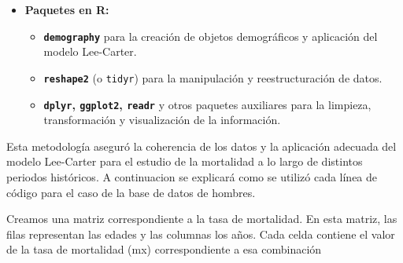 \documentclass[
]{article}
\newenvironment{Shaded}{\begin{snugshade}}{\end{snugshade}}
\newcommand{\AttributeTok}[1]{\textcolor[rgb]{0.77,0.63,0.00}{#1}}
\newcommand{\CommentTok}[1]{\textcolor[rgb]{0.56,0.35,0.01}{\textit{#1}}}
\newcommand{\DecValTok}[1]{\textcolor[rgb]{0.00,0.00,0.81}{#1}}
\newcommand{\FunctionTok}[1]{\textcolor[rgb]{0.00,0.00,0.00}{#1}}
\newcommand{\NormalTok}[1]{#1}
\newcommand{\OtherTok}[1]{\textcolor[rgb]{0.56,0.35,0.01}{#1}}
\newcommand{\SpecialCharTok}[1]{\textcolor[rgb]{0.00,0.00,0.00}{#1}}
\newcommand{\StringTok}[1]{\textcolor[rgb]{0.31,0.60,0.02}{#1}}
\providecommand{\tightlist}{%
  \setlength{\itemsep}{0pt}\setlength{\parskip}{0pt}}
\begin{document}
\begin{enumerate}
  \begin{itemize}
  \tightlist
  \item
    \textbf{Paquetes en R:}

    \begin{itemize}
    \tightlist
    \item
      \textbf{\texttt{demography}} para la creación de objetos
      demográficos y aplicación del modelo Lee-Carter.\\
    \item
      \textbf{\texttt{reshape2}} (o \texttt{tidyr}) para la manipulación
      y reestructuración de datos.\\
    \item
      \textbf{\texttt{dplyr}, \texttt{ggplot2}, \texttt{readr}} y otros
      paquetes auxiliares para la limpieza, transformación y
      visualización de la información.
    \end{itemize}
  \end{itemize}
\end{enumerate}

Esta metodología aseguró la coherencia de los datos y la aplicación
adecuada del modelo Lee-Carter para el estudio de la mortalidad a lo
largo de distintos periodos históricos. A continuacion se explicará como
se utilizó cada línea de código para el caso de la base de datos de
hombres.

\begin{Shaded}
\end{Shaded}

Creamos una matriz correspondiente a la tasa de mortalidad. En esta
matriz, las filas representan las edades y las columnas los años. Cada
celda contiene el valor de la tasa de mortalidad (mx) correspondiente a
esa combinación
\end{document}
